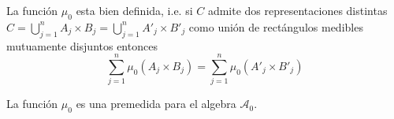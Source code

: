 \begin{proposicion}{} La función $\mu_0$ esta bien definida, i.e. si $C$ admite dos representaciones distintas   $C=\bigcup\limits_{j=1}^{n}A_j\times B_j=\bigcup\limits_{j=1}^{n}A'_j\times B'_j$ como unión de rectángulos medibles mutuamente disjuntos entonces
 \[
\sum_{j=1}^{n}\mu_0(A_j\times B_j)=\sum_{j=1}^{n}\mu_0(A'_j\times B'_j)
\]
\end{proposicion}

\begin{proposicion}{} La función $\mu_0$ es una premedida para el algebra $\mathscr{A}_0$.
\end{proposicion}
